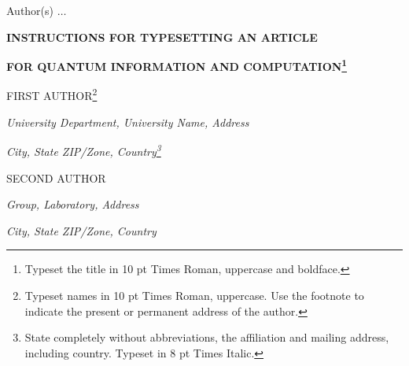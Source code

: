 \documentclass[twoside]{article}
\begin{document}
\setlength{\textheight}{8.0truein}    %

            {Author(s) $\ldots$}

\normalsize\textlineskip
\thispagestyle{empty}
\setcounter{page}{1}


\vspace*{0.88truein}

\alphfootnote


\centerline{\bf
INSTRUCTIONS FOR TYPESETTING AN ARTICLE}
\vspace*{0.035truein}
\centerline{\bf FOR QUANTUM INFORMATION AND COMPUTATION\footnote{Typeset the
title in 10 pt Times Roman, uppercase and boldface.}}
\vspace*{0.37truein}
\centerline{\footnotesize
FIRST AUTHOR\footnote{Typeset names in
10 pt Times Roman, uppercase. Use the footnote to indicate the
present or permanent address of the author.}}
\vspace*{0.015truein}
\centerline{\footnotesize\it University Department, University
Name, Address}
\baselineskip=10pt
\centerline{\footnotesize\it City, State ZIP/Zone,
Country\footnote{State completely without abbreviations, the
affiliation and mailing address, including country. Typeset in 8
pt Times Italic.}}
\vspace*{10pt}
\centerline{\footnotesize 
SECOND AUTHOR}
\vspace*{0.015truein}
\centerline{\footnotesize\it Group, Laboratory, Address}
\baselineskip=10pt
\centerline{\footnotesize\it City, State ZIP/Zone, Country}
\vspace*{0.225truein}

\vspace*{0.21truein}


\vspace*{10pt}
\end{document}
